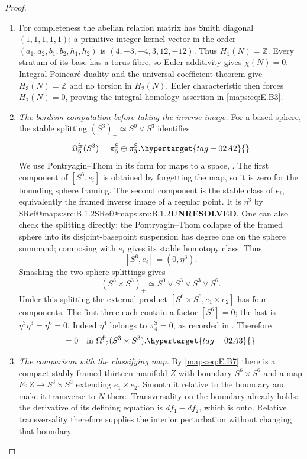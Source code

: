 \documentclass[11pt,a4paper]{article}
\makeatletter
\numberwithin{equation}{section}
\theoremstyle{definition}
\newcommand{\SeriesRefText}[1]{\ifcsname SRef@#1\endcsname\csname SRef@#1\endcsname\else\textbf{UNRESOLVED}\fi}
\newcommand{\SeriesRef}[1]{\ifmmode\text{\SeriesRefText{#1}}\else\SeriesRefText{#1}\fi}
\makeatother
\begin{document}
\begin{proof}
\begin{enumerate}[label=\arabic*.,leftmargin=*]
\item For completeness the abelian relation matrix has Smith
diagonal $(1,1,1,1,1)$; a primitive integer kernel vector in
the order $(a_1,a_2,b_1,b_2,h_1,h_2)$ is
$(4,-3,-4,3,12,-12)$. Thus $H_1(N)=\mathbb Z$.
Every stratum of its base has a torus fibre, so Euler
additivity gives $\chi(N)=0$. Integral Poincar\'e duality and
the universal coefficient theorem give $H_3(N)=\mathbb Z$
and no torsion in $H_2(N)$. Euler characteristic then forces
$H_2(N)=0$, proving the integral homology assertion in \eqref{maps:eq:E.B3}.

\item \emph{The bordism computation before taking the inverse image.}
For a based sphere, the stable splitting
$(S^3)_+\simeq S^0\vee S^3$ identifies
\begin{equation}
 \Omega^{\mathrm{fr}}_6(S^3)
       =\pi^{\mathrm S}_6\oplus\pi^{\mathrm S}_3.
 \hypertarget{tag-02A2}{}\label{maps:eq:E.B6}
\end{equation}
We use Pontryagin--Thom in its form for maps to a space,
\cite[Definition~8.16, p.~209; Theorem~8.17 and proof, pp.~209--210]{rootDavisKirk01}.
The first component of $[S^6,e_i]$ is obtained by forgetting
the map, so it is zero for the bounding sphere framing.
The second component is the stable class of $e_i$, equivalently
the framed inverse image of a regular point. It is $\eta^3$
by \SeriesRef{maps:src:B.1.2}. One can also check the splitting directly: the
Pontryagin--Thom collapse of the framed sphere into its
disjoint-basepoint suspension has degree one on the sphere
summand; composing with $e_i$ gives its stable homotopy class.
Thus
\[
                         [S^6,e_i]=(0,\eta^3).
\]
Smashing the two sphere splittings gives
\[
 (S^3\times S^3)_+\simeq
       S^0\vee S^3\vee S^3\vee S^6.
\]
Under this splitting the external product
$[S^6\times S^6,e_1\times e_2]$ has four components.
The first three each contain a factor $[S^6]=0$; the last
is $\eta^3\eta^3=\eta^6=0$. Indeed $\eta^4$ belongs to
$\pi^{\mathrm S}_4=0$, as recorded in
\cite[Corollary~1.3 and Table~1, pp.~112--113]{IsaksenWangXu2023}. Therefore
\begin{equation}
 [S^6\times S^6,e_1\times e_2]=0
      \quad\hbox{in }\Omega^{\mathrm{fr}}_{12}(S^3\times S^3).
 \hypertarget{tag-02A3}{}\label{maps:eq:E.B7}
\end{equation}


\item \emph{The comparison with the classifying map.}
By \eqref{maps:eq:E.B7} there is a compact stably framed thirteen-manifold
$Z$ with boundary $S^6\times S^6$ and a map
$E:Z\to S^3\times S^3$ extending $e_1\times e_2$.
Smooth it relative to the boundary and make it transverse
to $N$ there. Transversality on the boundary already holds:
the derivative of its defining equation is $df_1-df_2$,
which is onto. Relative transversality therefore supplies
the interior perturbation without changing that boundary.


\end{enumerate}
\end{proof}
\end{document}
